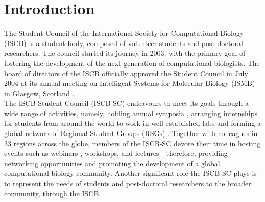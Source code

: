\documentclass[]{article}%
\begin{document}
	
	
	
	
	\section*{Introduction}
	The Student Council of the International Society for Computational Biology (ISCB) is a student body, composed of volunteer students and post-doctoral researchers. The council started its journey in 2003, with the primary goal of fostering the development of the next generation of computational biologists. The board of directors of the ISCB officially approved the Student Council in July 2004 at its annual meeting on Intelligent Systems for Molecular Biology (ISMB) in Glasgow, Scotland \citep{Gehlenborg2007}. \\ 
	
	The ISCB Student Council  (ISCB-SC) endeavours to meet its goals through a wide range of activities, namely, holding annual symposia \citep{corpas2005}, arranging internships for students from around the world to work in well-established labs \citep{anupama2018} and forming a global network of Regional Student Groups (RSGs) \citep{shome2016}. Together with colleagues in 33 regions across the globe, members of the ISCB-SC devote their time in hosting events such as webinars \citep{10simpleruleswebinar, rsgturkeybioinfonet}, workshops, and lectures - therefore, providing networking opportunities and promoting the development of a global computational biology community. Another significant role the ISCB-SC plays is to represent the needs of students and post-doctoral researchers to the broader community, through the ISCB.\\
	
\end{document}
